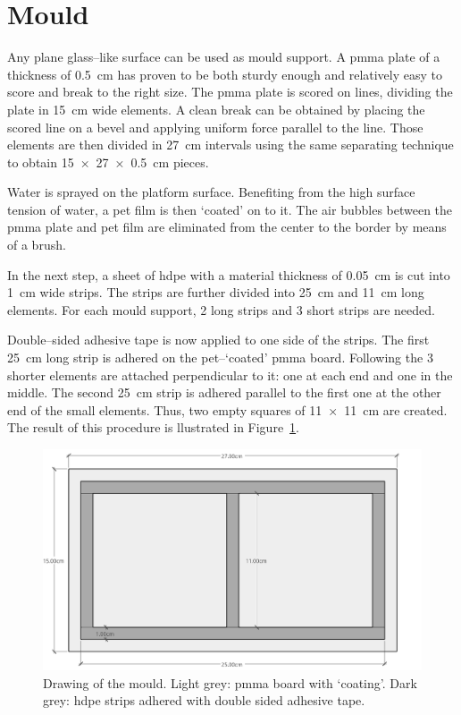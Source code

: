 \documentclass[review]{elsarticle}
\begin{document}
\section{Mould}

Any plane glass--like surface can be used as mould support.
A \gls{pmma} plate of a thickness of \SI{0.5}{\cm} has proven to be both sturdy enough and relatively easy to score and break to the right size.
The \gls{pmma} plate is scored on lines, dividing the plate in \SI{15}{\cm} wide elements.
A clean break can be obtained by placing the scored line on a bevel and applying uniform force parallel to the line.
Those elements are then divided in \SI{27}{\cm} intervals using the same separating technique to obtain \SI[product-units = single]{15 x 27 x 0.5}{\cm} pieces.

Water is sprayed on the platform surface.
Benefiting from the high surface tension of water, a \gls{pet} film is then `coated' on to it.
The air bubbles between the \gls{pmma} plate and \gls{pet} film are eliminated from the center to the border by means of a brush.

In the next step, a sheet of \gls{hdpe} with a material thickness of \SI{0.05}{\cm} is cut into \SI{1}{\cm} wide strips.
The strips are further divided into \SI{25}{\cm} and \SI{11}{\cm} long elements.
For each mould support, 2 long strips and 3 short strips are needed.

Double--sided adhesive tape is now applied to one side of the strips.
The first \SI{25}{\cm} long strip is adhered on the \gls{pet}--`coated' \gls{pmma} board.
Following the 3 shorter elements are attached perpendicular to it: one at each end and one in the middle.
The second \SI{25}{\cm} strip is adhered parallel to the first one at the other end of the small elements.
Thus, two empty squares of \SI[product-units = single]{11 x 11}{\cm} are created.
The result of this procedure is llustrated in Figure~\ref{fig:mould}.

\begin{figure}[htb]
\centering
\includegraphics[width=\textwidth]{mould}
\caption{Drawing of the mould. Light grey: \gls{pmma} board with `coating'. Dark grey: \gls{hdpe} strips adhered with double sided adhesive tape.}
\label{fig:mould}
\end{figure}
\end{document}
